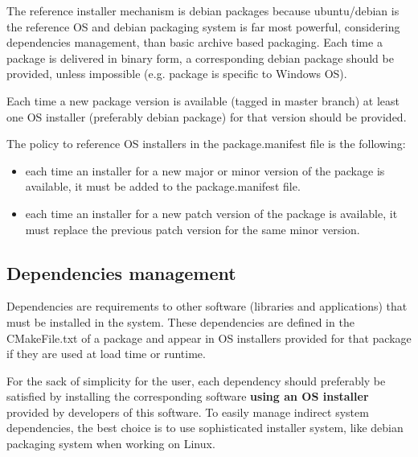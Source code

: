 \documentclass[12pt,a4paper]{article}
\begin{document}
The reference installer mechanism is debian packages because ubuntu/debian is the reference OS and debian packaging system is far most powerful, considering dependencies management, than basic archive based packaging. Each time a package is delivered in binary form, a corresponding debian package should be provided, unless impossible (e.g. package is specific to Windows OS).

Each time a new package version is available (tagged in master branch) at least one OS installer (preferably debian package) for that version should be provided.

The policy to reference OS installers in the package.manifest file is the following:
\begin{itemize}
\item each time an installer for a new major or minor version of the package is available, it must be added to the package.manifest file.
\item each time an installer for a new patch version of the package is available, it must replace the previous patch version for the same minor version.
\end{itemize}

\subsection{Dependencies management}

Dependencies are requirements to other software (libraries and applications) that must be installed in the system. These dependencies are defined in the CMakeFile.txt of a package and appear in OS installers provided for that package if they are used at load time or runtime. 

For the sack of simplicity for the user, each dependency should preferably be satisfied by installing the corresponding software \textbf{using an OS installer} provided by developers of this software. To easily manage indirect system dependencies, the best choice is to use sophisticated installer system, like debian packaging system when working on Linux.
\end{document}
